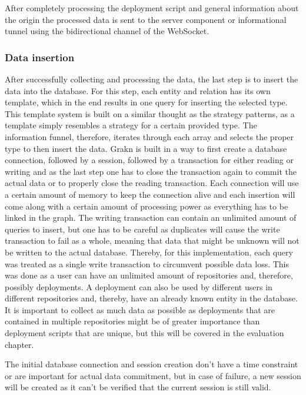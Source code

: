 After completely processing the deployment script and general information about the origin the processed data is sent to the server component or informational tunnel using the bidirectional channel of the WebSocket.

\subsubsection{Data insertion}
After successfully collecting and processing the data, the last step is to insert the data into the database. For this step, each entity and relation has its own template, which in the end results in one query for inserting the selected type. This template system is built on a similar thought as the strategy patterns, as a template simply resembles a strategy for a certain provided type. The information funnel, therefore, iterates through each array and selects the proper type to then insert the data.
Grakn is built in a way to first create a database connection, followed by a session, followed by a transaction for either reading or writing and as the last step one has to close the transaction again to commit the actual data or to properly close the reading transaction.
Each connection will use a certain amount of memory to keep the connection alive and each insertion will come along with a certain amount of processing power as everything has to be linked in the graph.
The writing transaction can contain an unlimited amount of queries to insert, but one has to be careful as duplicates will cause the write transaction to fail as a whole, meaning that data that might be unknown will not be written to the actual database. Thereby, for this implementation, each query was treated as a single write transaction to circumvent possible data loss. This was done as a user can have an unlimited amount of repositories and, therefore, possibly deployments. A deployment can also be used by different users in different repositories and, thereby, have an already known entity in the database. It is important to collect as much data as possible as deployments that are contained in multiple repositories might be of greater importance than deployment scripts that are unique, but this will be covered in the evaluation chapter.

The initial database connection and session creation don't have a time constraint or are important for actual data commitment, but in case of failure, a new session will be created as it can't be verified that the current session is still valid.


